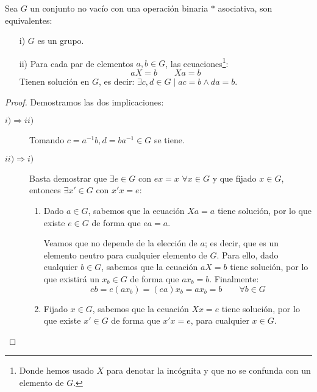 \begin{prop}\label{prop:carac_grupo_ec}
    Sea $G$ un conjunto no vacío con una operación binaria $\ast$ asociativa, son equivalentes:
    \begin{enumerate}
        \item[i)] $G$ es un grupo.
        \item[ii)] Para cada par de elementos $a,b\in G$, las ecuaciones\footnote{Donde hemos usado $X$ para denotar la incógnita y que no se confunda con un elemento de $G$.}:
            \begin{equation*}
                aX = b \qquad Xa = b
            \end{equation*}
            Tienen solución en $G$, es decir: $\exists c,d\in G\mid ac=b \land da = b$.
    \end{enumerate}
    \begin{proof}
        Demostramos las dos implicaciones:
        \begin{description}
            \item [$i)\Rightarrow ii)$] Tomando $c=a^{-1}b,d = ba^{-1}\in G$ se tiene.
            \item [$ii)\Rightarrow i)$] Basta demostrar que $\exists e\in G$ con $ex = x$ $\forall x\in G$ y que fijado $x\in G$, entonces $\exists x'\in G$ con $x'x = e$:

                \begin{enumerate}
                    \item Dado $a\in G$, sabemos que la ecuación $Xa=a$ tiene solución, por lo que existe $e\in G$ de forma que $ea = a$.

                        Veamos que no depende de la elección de $a$; es decir, que es un elemento neutro para cualquier elemento de $G$. Para ello, dado cualquier $b\in G$, sabemos que la ecuación $aX=b$ tiene solución, por lo que existirá un $x_b\in G$ de forma que $ax_b=b$. Finalmente:
                        \begin{equation*}
                            eb = e(ax_b) = (ea)x_b = ax_b = b \qquad \forall b\in G
                        \end{equation*}
                    \item Fijado $x\in G$, sabemos que la ecuación $Xx=e$ tiene solución, por lo que existe $x'\in G$ de forma que $x'x = e$, para cualquier $x\in G$.
                \end{enumerate}
        \end{description}
    \end{proof}
\end{prop}

